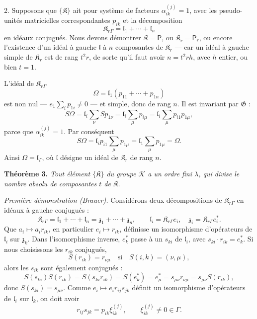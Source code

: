 2. Supposons que \(\{\mathfrak K\}\) ait pour système de facteurs \(\alpha_{ik}^{(j)}=1\), avec les pseudo-unités matricielles correspondantes \(p_{ik}\) et la décomposition
\[
\mathfrak K_{r\Gamma}=\mathfrak l_1+\cdots+\mathfrak l_n
\]
en idéaux conjugués. Nous devons démontrer \(\mathfrak K=\mathsf P\), ou \(\mathfrak K_r=\mathsf P_r\), ou encore l'existence d'un idéal à gauche \(\mathfrak l\) à \(n\) composantes de \(\mathfrak K_r\) --- car un idéal à gauche simple de \(\mathfrak K_r\) est de rang \(t^2r\), de sorte qu'il faut avoir \(n=t^2rh\), avec \(h\) entier, ou bien \(t=1\).

L'idéal de \(\mathfrak K_{r\Gamma}\)
\[
\Omega=\mathfrak l_1(p_{11}+\cdots+p_{1n})
\]
est non nul --- \(e_1\sum_i p_{1i}\ne0\) --- et simple, donc de rang \(n\). Il est invariant par \(\mathfrak G\) :
\[
S\Omega
=\mathfrak l_i\sum_\nu S p_{1\nu}
=\mathfrak l_i\sum_\mu p_{i\mu}
=\mathfrak l_i\sum_\mu p_{i1}p_{1\mu},
\]
parce que \(\alpha_{ik}^{(j)}=1\). Par conséquent
\[
S\Omega=\mathfrak l_ip_{i1}\sum_\mu p_{1\mu}
=\mathfrak l_1\sum_\mu p_{1\mu}
=\Omega.
\]
Ainsi \(\Omega=\mathfrak l_\Gamma\), où \(\mathfrak l\) désigne un idéal de \(\mathfrak K_r\) de rang \(n\).

\textbf{Théorème 3.} \emph{Tout élément \(\{\mathfrak K\}\) du groupe \(\mathscr K\) a un ordre fini \(\lambda\), qui divise le nombre absolu de composantes \(t\) de \(\mathfrak K\).}

\emph{Première démonstration (Brauer).} Considérons deux décompositions de \(\mathfrak K_{r\Gamma}\) en idéaux à gauche conjugués :
\[
\mathfrak K_{r\Gamma}=\mathfrak l_1+\cdots+\mathfrak l_n=\mathfrak z_1+\cdots+\mathfrak z_n,\qquad
\mathfrak l_i=\mathfrak K_{r\Gamma}e_i,\quad
\mathfrak z_i=\mathfrak K_{r\Gamma}e_i^*.
\]
Que \(a_i\mapsto a_ir_{ik}\), en particulier \(e_i\mapsto r_{ik}\), définisse un isomorphisme d'opérateurs de \(\mathfrak l_i\) sur \(\mathfrak z_k\). Dans l'isomorphisme inverse, \(e_k^*\) passe à un \(s_{ki}\) de \(\mathfrak l_i\), avec \(s_{ki}\cdot r_{ik}=e_k^*\). Si nous choisissons les \(r_{ik}\) conjugués,
\[
S(r_{ik})=r_{\nu\mu}\quad\text{si}\quad S(i,k)=(\nu,\mu),
\]
alors les \(s_{ik}\) sont également conjugués :
\[
S(s_{ki})S(r_{ik})=S(s_{ki}r_{ik})=S(e_k^*)=e_\mu^*
=s_{\mu\nu}r_{\nu\mu}=s_{\mu\nu}S(r_{ik}),
\]
donc \(S(s_{ki})=s_{\mu\nu}\). Comme \(e_i\mapsto e_ir_{ij}s_{jk}\) définit un isomorphisme d'opérateurs de \(\mathfrak l_i\) sur \(\mathfrak l_k\), on doit avoir
\[
r_{ij}s_{jk}=p_{ik}\xi_{ik}^{(j)},\qquad
\xi_{ik}^{(j)}\ne0\in\Gamma.
\]


